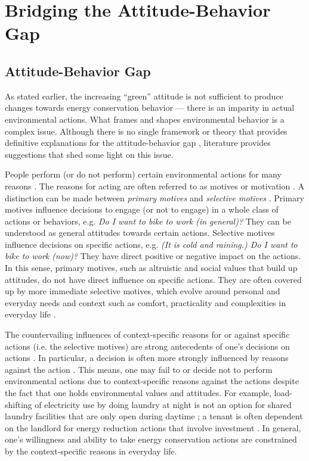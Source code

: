 \documentclass[a4paper]{article}
\begin{document}
\section{Bridging the Attitude-Behavior Gap} 
\label{sec:bridgingGap}

\subsection{Attitude-Behavior Gap } 
\label{sec:bridgingGap:gap}

As stated earlier, the increasing ``green'' attitude is not sufficient to produce changes towards energy conservation behavior --- there is an imparity in actual environmental actions. 
What frames and shapes environmental behavior is a complex issue. Although there is no single framework or theory that provides definitive explanations for the attitude-behavior gap \citep{Kollmuss2002,Schultz2014}, literature provides suggestions that shed some light on this issue. 

People perform (or do not perform) certain environmental actions for many reasons \citep{Schultz2002}. The reasons for acting are often referred to as motives or motivation \citep{Parfit1997,Moisander2007}. A distinction can be made between \textit{primary motives} and \textit{selective motives} \citep{Kollmuss2002,Moisander2007}. Primary motives influence decisions to engage (or not to engage) in a whole class of actions or behaviors, e.g. \textit{Do I want to bike to work (in general)?} They can be understood as general attitudes towards certain actions. Selective motives influence decisions on specific actions, e.g. \textit{(It is cold and raining.) Do I want to bike to work (now)?} They have direct positive or negative impact on the actions. In this sense, primary motives, such as altruistic and social values that build up attitudes, do not have direct influence on specific actions. They are often covered up by more immediate selective motives, which evolve around personal and everyday needs and context such as comfort, practicality and complexities in everyday life \citep{Kollmuss2002,Berthou2013,Selvefors2015}. 

The countervailing influences of context-specific reasons for or against specific actions (i.e. the selective motives) are strong antecedents of one's decisions on actions \citep{Claudy2013}. In particular, a decision is often more strongly influenced by reasons against 
the action \citep{Claudy2013,Berthou2013}. This means, one may fail to or decide not to perform environmental actions due to context-specific reasons against the actions despite the fact that one holds environmental values and attitudes. For example, load-shifting of electricity use by doing laundry at night is not an option for shared laundry facilities that are only open during daytime \citep{Entwistle2015}; a tenant is often dependent on the landlord for energy reduction actions that involve investment \citep{Dillahunt2010}. In general, one's willingness and ability to take energy conservation actions are constrained by the context-specific reasons in everyday life. 
\end{document}
